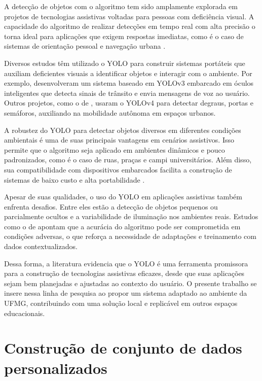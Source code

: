 A detecção de objetos com o algoritmo tem sido amplamente explorada em projetos de tecnologias assistivas voltadas para pessoas com deficiência visual. A capacidade do algoritmo de realizar detecções em tempo real com alta precisão o torna ideal para aplicações que exigem respostas imediatas, como é o caso de sistemas de orientação pessoal e navegação urbana \cite{redmon2016}.

Diversos estudos têm utilizado o YOLO para construir sistemas portáteis que auxiliam deficientes visuais a identificar objetos e interagir com o ambiente. Por exemplo,  desenvolveram um sistema baseado em YOLOv3 embarcado em óculos inteligentes que detecta sinais de trânsito e envia mensagens de voz ao usuário. Outros projetos, como o de , usaram o YOLOv4 para detectar degraus, portas e semáforos, auxiliando na mobilidade autônoma em espaços urbanos.

A robustez do YOLO para detectar objetos diversos em diferentes condições ambientais é uma de suas principais vantagens em cenários assistivos. Isso permite que o algoritmo seja aplicado em ambientes dinâmicos e pouco padronizados, como é o caso de ruas, praças e campi universitários. Além disso, sua compatibilidade com dispositivos embarcados facilita a construção de sistemas de baixo custo e alta portabilidade \cite{bochkovskiy2020}.

Apesar de suas qualidades, o uso do YOLO em aplicações assistivas também enfrenta desafios. Entre eles estão a detecção de objetos pequenos ou parcialmente ocultos e a variabilidade de iluminação nos ambientes reais. Estudos como o de  apontam que a acurácia do algoritmo pode ser comprometida em condições adversas, o que reforça a necessidade de adaptações e treinamento com dados contextualizados.

Dessa forma, a literatura evidencia que o YOLO é uma ferramenta promissora para a construção de tecnologias assistivas eficazes, desde que suas aplicações sejam bem planejadas e ajustadas ao contexto do usuário. O presente trabalho se insere nessa linha de pesquisa ao propor um sistema adaptado ao ambiente da UFMG, contribuindo com uma solução local e replicável em outros espaços educacionais.

\section{Construção de conjunto de dados personalizados}

